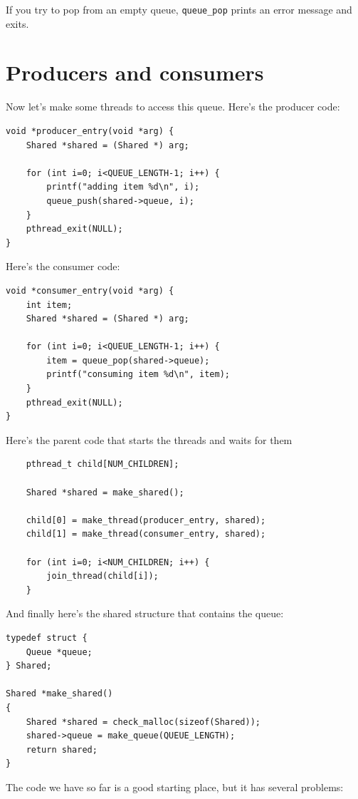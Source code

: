 \documentclass[12pt]{book}
\begin{document}
{If you try to pop from an empty queue, \verb"queue_pop" prints
an error message and exits.


\section{Producers and consumers}
\label{prodcon}

Now let's make some threads to access this queue.  Here's the
producer code:

\begin{verbatim}
void *producer_entry(void *arg) {
    Shared *shared = (Shared *) arg;

    for (int i=0; i<QUEUE_LENGTH-1; i++) {
        printf("adding item %d\n", i);
        queue_push(shared->queue, i);
    }
    pthread_exit(NULL);
}
\end{verbatim}

Here's the consumer code:

\begin{verbatim}
void *consumer_entry(void *arg) {
    int item;
    Shared *shared = (Shared *) arg;

    for (int i=0; i<QUEUE_LENGTH-1; i++) {
        item = queue_pop(shared->queue);
        printf("consuming item %d\n", item);
    }
    pthread_exit(NULL);
}
\end{verbatim}

Here's the parent code that starts the threads and waits for them

\begin{verbatim}
    pthread_t child[NUM_CHILDREN];

    Shared *shared = make_shared();

    child[0] = make_thread(producer_entry, shared);
    child[1] = make_thread(consumer_entry, shared);

    for (int i=0; i<NUM_CHILDREN; i++) {
        join_thread(child[i]);
    }
\end{verbatim}

And finally here's the shared structure that contains the queue:

\begin{verbatim}
typedef struct {
    Queue *queue;
} Shared;

Shared *make_shared()
{
    Shared *shared = check_malloc(sizeof(Shared));
    shared->queue = make_queue(QUEUE_LENGTH);
    return shared;
}
\end{verbatim}

The code we have so far is a good starting place, but it has
several problems:

}
\end{document}
